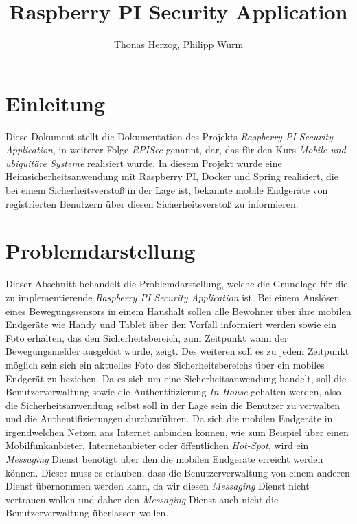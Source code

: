 \documentclass[]{article}
\title{Raspberry PI Security Application}
\author{Thonas Herzog, Philipp Wurm}
\begin{document}
\maketitle

\begin{abstract}
\end{abstract}

\section{Einleitung}
Diese Dokument stellt die Dokumentation des Projekts \emph{Raspberry PI Security Application}, in weiterer Folge \emph{RPISec} genannt, dar, das für den Kurs \emph{Mobile und ubiquitäre Systeme} realisiert wurde. In diesem Projekt wurde eine Heimsicherheitsanwendung mit Raspberry PI, Docker und Spring realisiert, die bei einem Sicherheitsverstoß in der Lage ist, bekannte mobile Endgeräte von registrierten Benutzern über diesen Sicherheitsverstoß zu informieren. 

\section{Problemdarstellung}
Dieser Abschnitt behandelt die Problemdarstellung, welche die Grundlage für die zu implementierende \emph{Raspberry PI Security Application} ist. Bei einem Auslösen eines Bewegungssensors in einem Haushalt sollen alle Bewohner über ihre mobilen Endgeräte wie Handy und Tablet über den Vorfall informiert werden sowie ein Foto erhalten, das den Sicherheitsbereich, zum Zeitpunkt wann der Bewegungsmelder ausgelöst wurde, zeigt. Des weiteren soll es zu jedem Zeitpunkt möglich sein sich ein aktuelles Foto des Sicherheitsbereichs über ein mobiles Endgerät zu beziehen.  
\newline
\newline
Da es sich um eine Sicherheitsanwendung handelt, soll die Benutzerverwaltung sowie die Authentifizierung \emph{In-House} gehalten werden, also die Sicherheitsanwendung selbst soll in der Lage sein die Benutzer zu verwalten und die Authentifizierungen durchzuführen. Da sich die mobilen Endgeräte in irgendwelchen Netzen ans Internet anbinden können, wie zum Beispiel über einen Mobilfunkanbieter, Internetanbieter oder öffentlichen \emph{Hot-Spot}, wird ein \emph{Messaging} Dienst benötigt über den die mobilen Endgeräte erreicht werden können. Dieser muss es erlauben, dass die Benutzerverwaltung von einem anderen Dienst übernommen werden kann, da wir diesen \emph{Messaging} Dienst nicht vertrauen wollen und daher den \emph{Messaging} Dienst auch nicht die Benutzerverwaltung überlassen wollen.
\newpage
\end{document}
